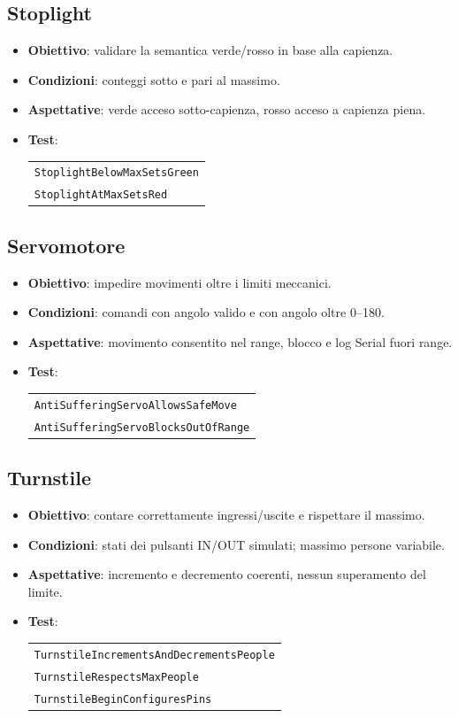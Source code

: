\subsection{Stoplight}
\begin{itemize}
  \item \textbf{Obiettivo}: validare la semantica verde/rosso in base alla capienza.
  \item \textbf{Condizioni}: conteggi sotto e pari al massimo.
  \item \textbf{Aspettative}: verde acceso sotto-capienza, rosso acceso a capienza piena.
  \item \textbf{Test}:
  \begin{tabular}[t]{@{}l@{}}
    \texttt{StoplightBelowMaxSetsGreen}\\
    \texttt{StoplightAtMaxSetsRed}
  \end{tabular}
\end{itemize}

\subsection{Servomotore}
\begin{itemize}
  \item \textbf{Obiettivo}: impedire movimenti oltre i limiti meccanici.
  \item \textbf{Condizioni}: comandi con angolo valido e con angolo oltre 0--180.
  \item \textbf{Aspettative}: movimento consentito nel range, blocco e log Serial fuori range.
  \item \textbf{Test}:
  \begin{tabular}[t]{@{}l@{}}
    \texttt{AntiSufferingServoAllowsSafeMove}\\
    \texttt{AntiSufferingServoBlocksOutOfRange}
  \end{tabular}
\end{itemize}

\subsection{Turnstile}
\begin{itemize}
  \item \textbf{Obiettivo}: contare correttamente ingressi/uscite e rispettare il massimo.
  \item \textbf{Condizioni}: stati dei pulsanti IN/OUT simulati; massimo persone variabile.
  \item \textbf{Aspettative}: incremento e decremento coerenti, nessun superamento del limite.
  \item \textbf{Test}:
  \begin{tabular}[t]{@{}l@{}}
    \texttt{TurnstileIncrementsAndDecrementsPeople}\\
    \texttt{TurnstileRespectsMaxPeople}\\
    \texttt{TurnstileBeginConfiguresPins}
  \end{tabular}
\end{itemize}

